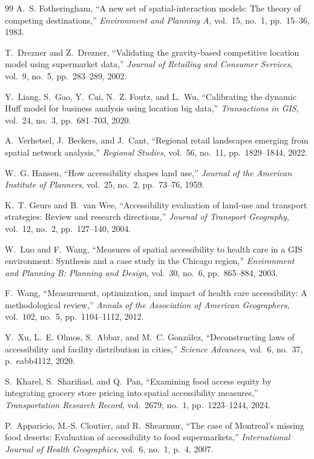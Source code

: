 \documentclass[conference]{IEEEtran}
\begin{document}
\begin{thebibliography}{99}
A.~S. Fotheringham, ``A new set of spatial-interaction models: The
theory of competing destinations,'' \textit{Environment and Planning A},
vol.~15, no.~1, pp.~15--36, 1983.

T.~Drezner and Z.~Drezner, ``Validating the gravity-based competitive
location model using supermarket data,'' \textit{Journal of Retailing
and Consumer Services}, vol.~9, no.~5, pp.~283--289, 2002.

Y.~Liang, S.~Gao, Y.~Cai, N.~Z. Foutz, and L.~Wu, ``Calibrating the
dynamic Huff model for business analysis using location big data,''
\textit{Transactions in GIS}, vol.~24, no.~3, pp.~681--703, 2020.

A.~Verhetsel, J.~Beckers, and J.~Cant, ``Regional retail landscapes
emerging from spatial network analysis,'' \textit{Regional Studies},
vol.~56, no.~11, pp.~1829--1844, 2022.

W.~G. Hansen, ``How accessibility shapes land use,''
\textit{Journal of the American Institute of Planners}, vol.~25,
no.~2, pp.~73--76, 1959.

K.~T. Geurs and B.~van Wee, ``Accessibility evaluation of land-use and
transport strategies: Review and research directions,''
\textit{Journal of Transport Geography}, vol.~12, no.~2,
pp.~127--140, 2004.

W.~Luo and F.~Wang, ``Measures of spatial accessibility to health care
in a GIS environment: Synthesis and a case study in the Chicago
region,'' \textit{Environment and Planning B: Planning and Design},
vol.~30, no.~6, pp.~865--884, 2003.

F.~Wang, ``Measurement, optimization, and impact of health care
accessibility: A methodological review,'' \textit{Annals of the
Association of American Geographers}, vol.~102, no.~5,
pp.~1104--1112, 2012.

Y.~Xu, L.~E. Olmos, S.~Abbar, and M.~C. Gonz\'{a}lez,
``Deconstructing laws of accessibility and facility distribution in
cities,'' \textit{Science Advances}, vol.~6, no.~37, p.~eabb4112,
2020.

S.~Kharel, S.~Sharifiasl, and Q.~Pan, ``Examining food access equity
by integrating grocery store pricing into spatial accessibility
measures,'' \textit{Transportation Research Record}, vol.~2679,
no.~1, pp.~1223--1244, 2024.

P.~Apparicio, M.-S. Cloutier, and R.~Shearmur, ``The case of
Montreal's missing food deserts: Evaluation of accessibility to food
supermarkets,'' \textit{International Journal of Health Geographics},
vol.~6, no.~1, p.~4, 2007.


\end{thebibliography}
\end{document}
